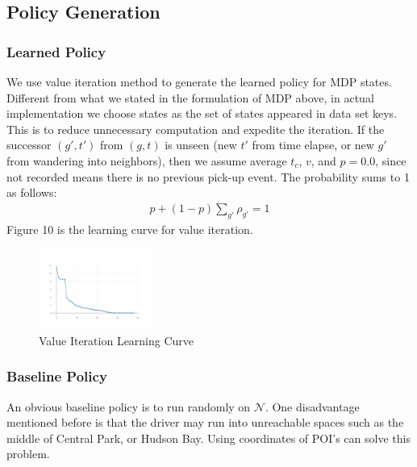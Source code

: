 \documentclass[letterpaper, 10 pt, conference]{ieeeconf}
\begin{document}
\subsection{Policy Generation}
\subsubsection{Learned Policy}
We use value iteration method to generate the learned policy for MDP states. Different from what we stated in the formulation of MDP above, in actual implementation we choose states as the set of states appeared in data set keys. This is to reduce unnecessary computation and expedite the iteration. If the successor $(g',t')$ from $(g,t)$ is unseen (new $t'$ from time elapse, or new $g'$ from wandering into neighbors), then we assume average $t_c$, $v$, and $p=0.0$, since not recorded means there is no previous pick-up event. The probability sums to 1 as follows:
\begin{align}
p + (1-p)\sum_{g'}\rho_{g'} =1
\end{align}
Figure 10 is the learning curve for value iteration.
\begin{figure}
\centering
\includegraphics[width=0.33\textwidth]{tiny_VI_curve.png}
\caption{Value Iteration Learning Curve}
\end{figure}
\subsubsection{Baseline Policy}
An obvious baseline policy is to run randomly on $\mathcal{N}$. One disadvantage mentioned before is that the driver may run into unreachable spaces such as the middle of Central Park, or Hudson Bay. Using coordinates of POI's can solve this problem.
\end{document}
